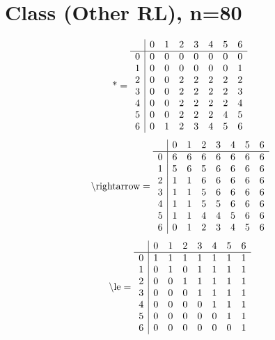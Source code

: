 \documentclass[11pt]{article}
\begin{document}
\section{Class (Other RL), n=80}
\[\text{*} = 
\begin{array}{r | r r r r r r r}
 & 0 & 1 & 2 & 3 & 4 & 5 & 6 \\ \hline
0 & 0 & 0 & 0 & 0 & 0 & 0 & 0 \\
1 & 0 & 0 & 0 & 0 & 0 & 0 & 1 \\
2 & 0 & 0 & 2 & 2 & 2 & 2 & 2 \\
3 & 0 & 0 & 2 & 2 & 2 & 2 & 3 \\
4 & 0 & 0 & 2 & 2 & 2 & 2 & 4 \\
5 & 0 & 0 & 2 & 2 & 2 & 4 & 5 \\
6 & 0 & 1 & 2 & 3 & 4 & 5 & 6 \\
\end{array}
\]
\[\text{\textbackslash rightarrow} = 
\begin{array}{r | r r r r r r r}
 & 0 & 1 & 2 & 3 & 4 & 5 & 6 \\ \hline
0 & 6 & 6 & 6 & 6 & 6 & 6 & 6 \\
1 & 5 & 6 & 5 & 6 & 6 & 6 & 6 \\
2 & 1 & 1 & 6 & 6 & 6 & 6 & 6 \\
3 & 1 & 1 & 5 & 6 & 6 & 6 & 6 \\
4 & 1 & 1 & 5 & 5 & 6 & 6 & 6 \\
5 & 1 & 1 & 4 & 4 & 5 & 6 & 6 \\
6 & 0 & 1 & 2 & 3 & 4 & 5 & 6 \\
\end{array}
\]
\[\text{\textbackslash le} = 
\begin{array}{r | r r r r r r r}
 & 0 & 1 & 2 & 3 & 4 & 5 & 6 \\ \hline
0 & 1 & 1 & 1 & 1 & 1 & 1 & 1 \\
1 & 0 & 1 & 0 & 1 & 1 & 1 & 1 \\
2 & 0 & 0 & 1 & 1 & 1 & 1 & 1 \\
3 & 0 & 0 & 0 & 1 & 1 & 1 & 1 \\
4 & 0 & 0 & 0 & 0 & 1 & 1 & 1 \\
5 & 0 & 0 & 0 & 0 & 0 & 1 & 1 \\
6 & 0 & 0 & 0 & 0 & 0 & 0 & 1 \\
\end{array}
\]
\end{document}
